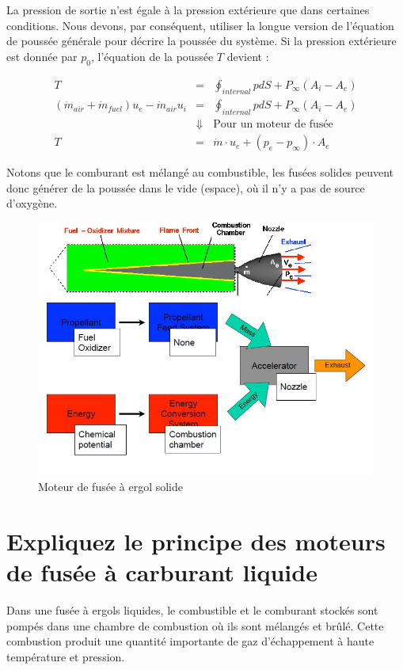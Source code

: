 \documentclass{report}
\begin{document}
La pression de sortie n'est égale à la pression extérieure que dans certaines conditions. Nous devons, par conséquent, utiliser la longue version de l'équation de poussée générale pour décrire la poussée du système. Si la pression extérieure est donnée par $p_0$, l'équation de la poussée $T$ devient :

\begin{eqnarray}
T &= &\oint_{internal}pdS+P_\infty (A_i-A_e)\\
(\dot{m}_{air}+\dot{m}_{fuel})u_e-\dot{m}_{air}u_i &= &\oint_{internal}pdS+P_\infty (A_i-A_e)\\
 & \Downarrow &\text{Pour un moteur de fusée}\\
T &= &\dot{m}\cdot u_e +(p_e-p_\infty)\cdot A_e
\end{eqnarray}

Notons que le comburant est mélangé au combustible, les fusées solides peuvent donc générer de la poussée dans le vide (espace), où il n'y a pas de source d'oxygène. 

\begin{figure}[h!]
    \centering
    \includegraphics[scale=0.6]{40.JPG}
    \caption{Moteur de fusée à ergol solide}
    \label{40}
\end{figure}



\section{Expliquez le principe des moteurs de fusée à carburant liquide}

Dans une fusée à ergols liquides, le combustible et le comburant stockés sont pompés dans une chambre de combustion où ils sont mélangés et brûlé. Cette combustion produit une quantité importante de gaz d'échappement à haute température et pression.
\end{document}
